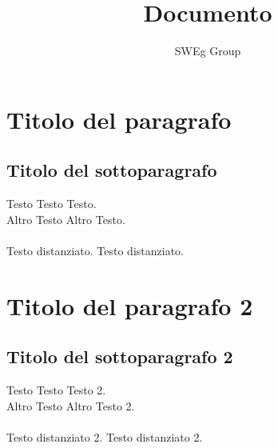 \documentclass[12pt,a4paper,titlepage]{article}
\begin{document}
 

\title{Documento}
\author{SWEg Group}
\date{}
\maketitle


\tableofcontents
\thispagestyle{empty}

\newpage



\section{Titolo del paragrafo}
\subsection{Titolo del sottoparagrafo}
Testo Testo Testo.\\
Altro Testo Altro Testo.\\
\\
Testo distanziato. Testo distanziato. 

\section{Titolo del paragrafo 2}
\subsection{Titolo del sottoparagrafo 2}
Testo Testo Testo 2.\\
Altro Testo Altro Testo 2.\\
\\
Testo distanziato 2. Testo distanziato 2. 
\end{document}
